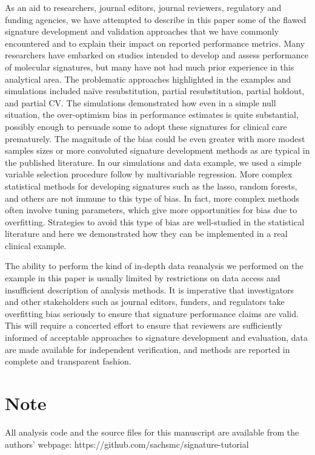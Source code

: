 \documentclass[11pt,]{article}
\begin{document}
As an aid to researchers, journal editors, journal reviewers, regulatory
and funding agencies, we have attempted to describe in this paper some
of the flawed signature development and validation approaches that we
have commonly encountered and to explain their impact on reported
performance metrics. Many researchers have embarked on studies intended
to develop and assess performance of molecular signatures, but many have
not had much prior experience in this analytical area. The problematic
approaches highlighted in the examples and simulations included naïve
resubstitution, partial resubstitution, partial holdout, and partial CV.
The simulations demonstrated how even in a simple null situation, the
over-optimism bias in performance estimates is quite substantial,
possibly enough to persuade some to adopt these signatures for clinical
care prematurely. The magnitude of the bias could be even greater with
more modest samples sizes or more convoluted signature development
methods as are typical in the published literature. In our simulations
and data example, we used a simple variable selection procedure follow
by multivariable regression. More complex statistical methods for
developing signatures such as the lasso, random forests, and others are
not immune to this type of bias. In fact, more complex methods often
involve tuning parameters, which give more opportunities for bias due to
overfitting. Strategies to avoid this type of bias are well-studied in
the statistical literature and here we demonstrated how they can be
implemented in a real clinical example.

The ability to perform the kind of in-depth data reanalysis we performed
on the example in this paper is usually limited by restrictions on data
access and insufficient description of analysis methods. It is
imperative that investigators and other stakeholders such as journal
editors, funders, and regulators take overfitting bias seriously to
ensure that signature performance claims are valid. This will require a
concerted effort to ensure that reviewers are sufficiently informed of
acceptable approaches to signature development and evaluation, data are
made available for independent verification, and methods are reported in
complete and transparent fashion.

\section{Note}\label{note}

All analysis code and the source files for this manuscript are available
from the authors' webpage: https://github.com/sachsmc/signature-tutorial

\renewcommand\refname{References}

\end{document}
